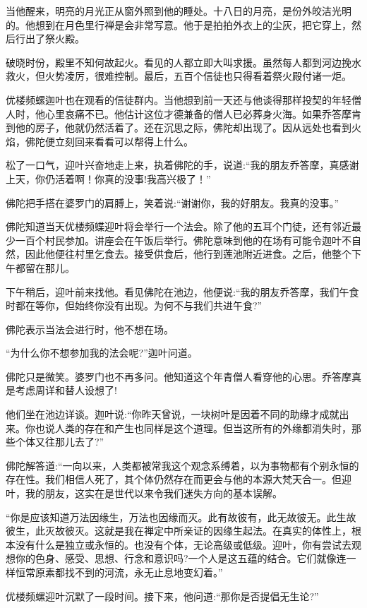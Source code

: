 \documentclass[12pt,twoside,openany]{book}
\begin{document}
当他醒来，明亮的月光正从窗外照到他的睡处。十八日的月亮，是份外皎洁光明的。他想到在月色里行禅是会非常写意。他于是拍拍外衣上的尘灰，把它穿上，然后行出了祭火殿。

破晓时份，殿里不知何故起火。看见的人都立即大叫求援。虽然每人都到河边挽水救火，但火势凌厉，很难控制。最后，五百个信徒也只得看着祭火殿付诸一炬。

优楼频螺迦叶也在观看的信徒群内。当他想到前一天还与他谈得那样投契的年轻僧人时，他心里哀痛不已。他估计这位才德兼备的僧人已必葬身火海。如果乔答摩肯到他的房子，他就仍然活着了。还在沉思之际，佛陀却出现了。因从远处也看到火焰，佛陀便立刻回来看看可以帮得上什么。

松了一口气，迎叶兴奋地走上来，执着佛陀的手，说道:“我的朋友乔答摩，真感谢上天，你仍活着啊！你真的没事!我高兴极了！”

佛陀把手搭在婆罗门的肩膊上，笑着说:“谢谢你，我的好朋友。我真的没事。”

佛陀知道当天优楼频蝶迎叶将会举行一个法会。除了他的五耳个门徒，还有邻近最少一百个村民参加。讲座会在午饭后举行。佛陀意味到他的在场有可能令迦叶不自然，因此他便往村里乞食去。接受供食后，他行到莲池附近进食。之后，他整个下午都留在那儿。

下午稍后，迎叶前来找他。看见佛陀在池边，他便说:“我的朋友乔答摩，我们午食时都在等你，但始终你没有出现。为何不与我们共进午食?”

佛陀表示当法会进行时，他不想在场。

“为什么你不想参加我的法会呢?”迦叶问道。

佛陀只是微笑。婆罗门也不再多问。他知道这个年青僧人看穿他的心思。乔答摩真是考虑周详和替人设想了!

他们坐在池边详谈。迦叶说:“你昨天曾说，一块树叶是因着不同的助缘才成就出来。你也说人类的存在和产生也同样是这个道理。但当这所有的外缘都消失时，那些个体又往那儿去了?”

佛陀解答道:“一向以来，人类都被常我这个观念系缚着，以为事物都有个别永恒的存在性。我们相信人死了，其个体仍然存在而更会与他的本源大梵天合一。但迎叶，我的朋友，这实在是世代以来令我们迷失方向的基本误解。

“你是应该知道万法因缘生，万法也因缘而灭。此有故彼有，此无故彼无。此生故彼生，此灭故彼灭。这就是我在禅定中所亲证的因缘生起法。在真实的体性上，根本没有什么是独立或永恒的。也没有个体，无论高级或低级。迎叶，你有尝试去观想你的色身、感受、思想、行念和意识吗?一个人是这五蕴的结合。它们就像连一样恒常原素都找不到的河流，永无止息地变幻着。”

优楼频螺迎叶沉默了一段时间。接下来，他问道:“那你是否提倡无生论?”
\end{document}
